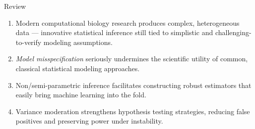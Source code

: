 \documentclass{beamer}
\begin{document}

\begin{frame}[c]{Review}
\begin{center}
\begin{enumerate}
  \itemsep6pt
  \item Modern computational biology research produces complex, heterogeneous
    data --- innovative statistical inference still tied to simplistic and
    challenging-to-verify modeling assumptions.
  \item \textit{Model misspecification} seriously undermines the scientific
    utility of common, classical statistical modeling approaches.
  \item Non/semi-parametric inference facilitates constructing robust estimators
    that easily bring machine learning into the fold.
  \item Variance moderation strengthens hypothesis testing strategies, reducing
    false positives and preserving power under instability.
\end{enumerate}
\end{center}


\end{frame}


\setbeamercovered{}
\beamerdefaultoverlayspecification{}

\begin{frame}[c,allowframebreaks]{}

\small



\end{frame}

\end{document}
